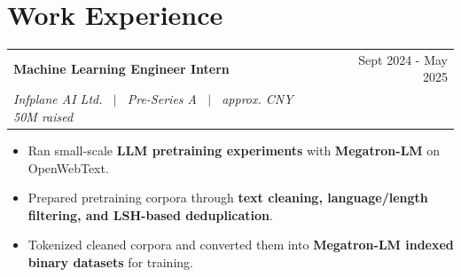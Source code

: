 \documentclass[a4paper,10pt]{article}
\makeatletter
\newlength{\cventrysep}
\newenvironment{joblong}[4] %
    {
    \begin{tabularx}{\linewidth}{@{}l X r@{}}
    \textbf{#1} & \hfill &  #2 \\
    \textit{#3} & \hfill & Advisor: #4 \\[3pt]
    \end{tabularx}
    \begin{minipage}[t]{\linewidth}
    \begin{itemize}[nosep, leftmargin=1em, itemsep=3pt,label=--]
    }
    {
    \unskip\nobreak\strut
    \end{itemize}
    \end{minipage}\par\vspace{\dimexpr\cventrysep-\parskip\relax}
    }
\newenvironment{joblongnoadvisor}[3] %
    {
    \begin{tabularx}{\linewidth}{@{}l X r@{}}
    \textbf{#1} & \hfill &  #2 \\
    \textit{#3} & \hfill & \\[3pt]
    \end{tabularx}
    \begin{minipage}[t]{\linewidth}
    \begin{itemize}[nosep, leftmargin=1em, itemsep=3pt,label=--]
    }
    {
    \unskip\nobreak\strut
    \end{itemize}
    \end{minipage}\par\vspace{\dimexpr\cventrysep-\parskip\relax}
    }
\makeatother
\begin{document}




\section{Work Experience}


\begin{joblongnoadvisor}{Machine Learning Engineer Intern}{Sept 2024 - May 2025}{Infplane AI Ltd. \ $|$ \ Pre-Series A \ $|$ \ approx. CNY 50M raised}
\item Ran small-scale \textbf{LLM pretraining experiments} with \textbf{Megatron-LM} on OpenWebText.
\item Prepared pretraining corpora through \textbf{text cleaning, language/length filtering, and LSH-based deduplication}.
\item Tokenized cleaned corpora and converted them into \textbf{Megatron-LM indexed binary datasets} for training.
\end{joblongnoadvisor}
\end{document}
